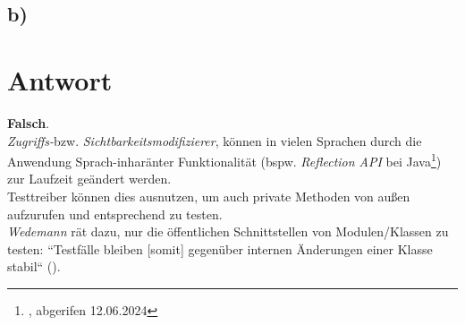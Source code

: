\subsection*{b)}

\section*{Antwort}


\textbf{Falsch}.\\
\textit{Zugriffs-}bzw. \textit{Sichtbarkeitsmodifizierer}, können in vielen Sprachen durch die Anwendung Sprach-inharänter Funktionalität (bspw. \textit{Reflection API} bei Java\footnote{
, abgerifen 12.06.2024
}) zur Laufzeit geändert werden.\\
Testtreiber können dies ausnutzen, um auch private Methoden von außen aufzurufen und entsprechend zu testen.\\

\noindent
\textit{Wedemann} rät dazu, nur die öffentlichen Schnittstellen von Modulen/Klassen zu testen: ``Testfälle bleiben [somit] gegenüber internen Änderungen einer Klasse stabil`` (\cite[56]{Wed09}).
